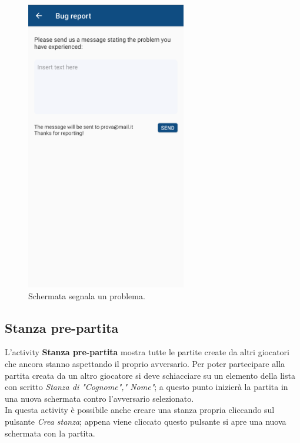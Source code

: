 \documentclass[a4paper,11pt,twoside,openright]{report}
\begin{document}
\begin{figure}[]
\centering
\includegraphics[width=\linewidth,height=360pt,keepaspectratio]{images/BugReport.png}
\caption{Schermata segnala un problema.}
\end{figure}

\subsection{Stanza pre-partita}
L'activity \textbf{Stanza pre-partita} mostra tutte le partite create da altri giocatori che ancora stanno aspettando il proprio avversario. Per poter partecipare alla partita creata da un altro
giocatore si deve schiacciare su un elemento della lista con scritto \textit{Stanza di "Cognome"," Nome"}; a questo punto inizierà la partita in una nuova schermata contro l'avversario selezionato.\\
In questa activity è possibile anche creare una stanza propria cliccando sul pulsante \textit{Crea stanza}; appena viene cliccato questo pulsante si apre una nuova schermata con la partita.
\end{document}
